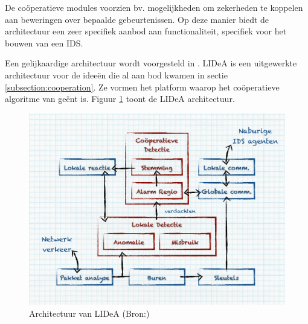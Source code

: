 De co\"operatieve modules voorzien bv. mogelijkheden om zekerheden te koppelen
aan beweringen over bepaalde gebeurtenissen. Op deze manier biedt de
architectuur een zeer specifiek aanbod aan functionaliteit, specifiek voor het
bouwen van een IDS.

Een gelijkaardige architectuur wordt voorgesteld in \citep{krontiris2008lidea}.
LIDeA is een uitgewerkte architectuur voor de idee\"en die al aan bod kwamen in
sectie \ref{subsection:cooperation}. Ze vormen het platform waarop het
co\"operatieve algoritme van \citep{krontiris2009cooperative} ge\"ent is.
Figuur \ref{fig:lidea-architecture} toont de LIDeA architectuur.

\begin{figure}[ht]
  \centering
  \includegraphics[width=0.9\linewidth]{resources/lidea-architecture.pdf}
  \caption[Architectuur van LIDeA]{Architectuur van LIDeA (Bron:\citep{krontiris2008lidea})}
  \label{fig:lidea-architecture}
\end{figure}
